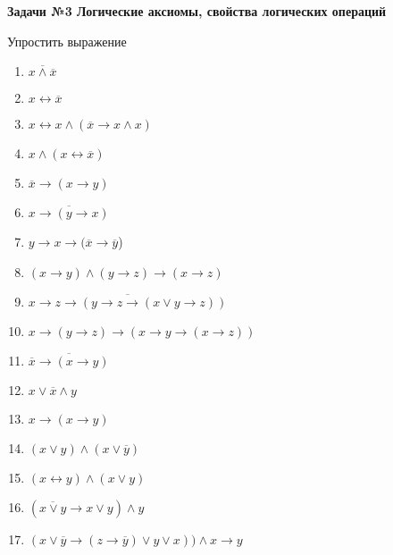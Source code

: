 \usepackage{stmaryrd}%




    \begin{center}
        \textbf{Задачи №3 Логические аксиомы, свойства логических операций}\\
    \end{center}

    \begin{center}
        Упростить выражение
    \end{center}

    \begin{enumerate}
        \item $\overline{x \wedge \overline x}$
        \item $x \leftrightarrow \overline x$
        \item $x \leftrightarrow x \wedge (\overline x \rightarrow x \wedge x)$
        \item $x \wedge (x \leftrightarrow \overline x)$
        \item $\overline{x} \rightarrow (x \rightarrow y)$
        \item $\overline{x \rightarrow (y \rightarrow x)}$
        \item $y \rightarrow x \rightarrow (\overline x \rightarrow \overline y$)
        \item $(x \rightarrow y) \wedge (y \rightarrow z) \rightarrow (x \rightarrow z)$
        \item $\overline{x \rightarrow z \rightarrow (y \rightarrow z \rightarrow (x \vee y \rightarrow z ))}$
        \item $x \rightarrow(y \rightarrow z) \rightarrow (x \rightarrow y \rightarrow (x \rightarrow z))$
        \item $\overline{\overline x \rightarrow (x \rightarrow y)}$
        \item $x \vee \overline x \wedge y$
        \item $x \rightarrow (x \rightarrow y)$
        \item $(x \vee y) \wedge (x \vee \overline y)$
        \item $(x \leftrightarrow y ) \wedge (x \vee y)$
        \item $(\overline{x \vee y} \rightarrow x\vee y) \wedge y$
        \item $(x \vee \overline y \rightarrow (z \rightarrow \overline y) \vee y \vee x)) \wedge x \rightarrow y$

\end{enumerate}
